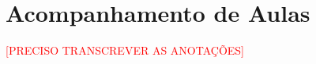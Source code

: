 \chapter{Acompanhamento de Aulas} %
\label{chap:Acompanhamento de Aulas}
\textcolor{red}{[PRECISO TRANSCREVER AS ANOTAÇÕES]}

